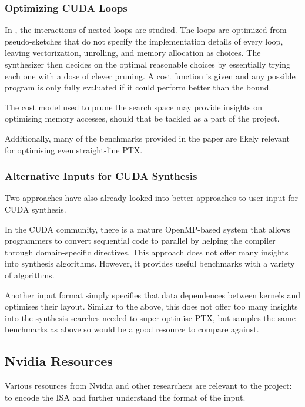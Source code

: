 \documentclass[letterpaper,twocolumn,10pt]{article}
\begin{document}
\subsubsection{Optimizing CUDA Loops}

In \cite{CUDALoops}, the interactions of nested loops are studied.
The loops are optimized from pseudo-sketches that
do not specify the implementation details of every
loop, leaving vectorization, unrolling, and memory allocation
as choices. The synthesizer then decides on the
optimal reasonable choices by essentially trying
each one with a dose of clever pruning. A cost
function is given and any possible program is
only fully evaluated if it could perform better
than the bound.

The cost model used to prune the search space
may provide insights on optimising memory
accesses, should that be tackled as a part of the
project.

Additionally, many of the benchmarks provided in
the paper are likely relevant for optimising
even straight-line PTX.

\subsubsection{Alternative Inputs for CUDA Synthesis}

Two approaches have also already looked into
better approaches to user-input for CUDA synthesis.

In the CUDA community, there is a mature OpenMP-based
system \cite{hicuda} that allows programmers to
convert sequential code to parallel by helping the
compiler through domain-specific directives.
This approach does not offer many insights into
synthesis algorithms. However, it provides useful
benchmarks with a variety of algorithms.

Another input format simply specifies that data dependences
between kernels and optimises their layout.
\cite{CUDASynth} Similar to the above, this does not
offer too many insights into the synthesis searches
needed to super-optimise PTX, but samples the
same benchmarks as above so would be a good resource
to compare against.

\subsection{Nvidia Resources}

Various resources from Nvidia and other researchers
are relevant to the project:
to encode the ISA and further understand the format
of the input.
\end{document}
